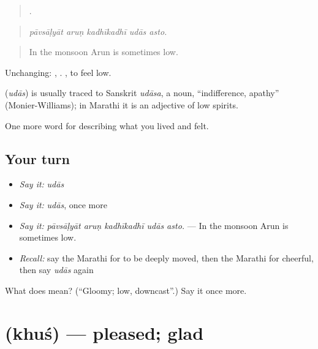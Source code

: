 \begin{quote}
    .
\end{quote}

\begin{quote}
\emph{pāvsāḷyāt aruṇ kadhīkadhī udās asto.}
\end{quote}

\begin{quote}
In the monsoon Arun is sometimes low.
\end{quote}

Unchanging:  ,  .  , to feel low.

\begin{cousinweb}
\textbf{} (\emph{udās}) is usually traced to Sanskrit \emph{udāsa}, a noun, \textquotedblleft{}indifference, apathy\textquotedblright{} (Monier-Williams); in Marathi it is an adjective of low spirits.
\end{cousinweb}

\begin{grammarlens}[title={What you've built}]
One more word for describing what you lived and felt.
\end{grammarlens}

\subsection*{Your turn}
\begin{itemize}
\raggedright
  \item \emph{Say it:} \emph{udās}
  \item \emph{Say it:} \emph{udās}, once more
  \item \emph{Say it:} \emph{pāvsāḷyāt aruṇ kadhīkadhī udās asto.} — In the monsoon Arun is sometimes low.
  \item \emph{Recall:} say the Marathi for to be deeply moved, then the Marathi for cheerful, then say \emph{udās} again
\end{itemize}

\begin{tcolorbox}[breakable,colback=teal!4,colframe=teal!35!black,title={Before you move on}]
What does  mean? (\textquotedblleft{}Gloomy; low, downcast\textquotedblright{}.) Say it once more.
\end{tcolorbox}
\section[\texorpdfstring{\mr{खुश} (khuś)}{खुश (khuś)}]{ (khuś) — pleased; glad}

